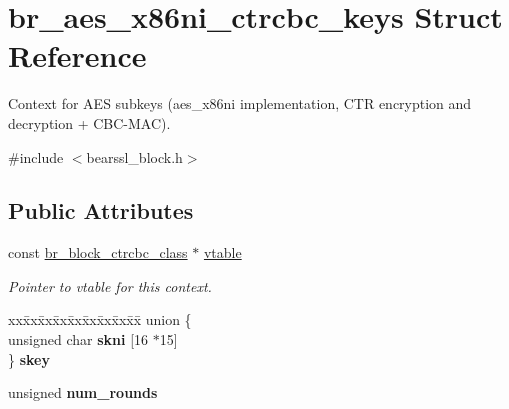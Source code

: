 \hypertarget{structbr__aes__x86ni__ctrcbc__keys}{}\section{br\+\_\+aes\+\_\+x86ni\+\_\+ctrcbc\+\_\+keys Struct Reference}
\label{structbr__aes__x86ni__ctrcbc__keys}


Context for A\+ES subkeys ({\ttfamily aes\+\_\+x86ni} implementation, C\+TR encryption and decryption + C\+B\+C-\/\+M\+AC).  




{\ttfamily \#include $<$bearssl\+\_\+block.\+h$>$}

\subsection*{Public Attributes}
\begin{DoxyCompactItemize}
\item 
\mbox{\label{structbr__aes__x86ni__ctrcbc__keys_a3559cf99c9885531fbc6392025cf1332}} 
const \hyperlink{bearssl__block_8h_acc35dad952fda67b68df0b107fe26f0b}{br\+\_\+block\+\_\+ctrcbc\+\_\+class} $\ast$ \hyperlink{structbr__aes__x86ni__ctrcbc__keys_a3559cf99c9885531fbc6392025cf1332}{vtable}
\begin{DoxyCompactList}\small\item\em Pointer to vtable for this context. \end{DoxyCompactList}\item 
\mbox{\label{structbr__aes__x86ni__ctrcbc__keys_ac05e3122e813b727473465a1a7e0af07}} 
\begin{tabbing}
xx\=xx\=xx\=xx\=xx\=xx\=xx\=xx\=xx\=\kill
union \{\\
\>unsigned char {\bfseries skni} \mbox{[}16 $\ast$15\mbox{]}\\
\} {\bfseries skey}\\

\end{tabbing}\item 
\mbox{\label{structbr__aes__x86ni__ctrcbc__keys_a28ed96beef8d0cd260cf293fe6ffe6bd}} 
unsigned {\bfseries num\+\_\+rounds}
\end{DoxyCompactItemize}


